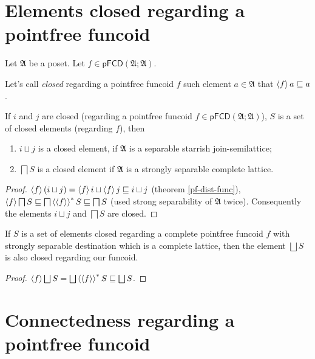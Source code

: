 \section{Elements closed regarding a pointfree funcoid}

Let $\mathfrak{A}$ be a poset. Let $f\in\mathsf{pFCD}(\mathfrak{A};\mathfrak{A})$.
\begin{defn}
Let's call \emph{closed}
regarding a pointfree funcoid $f$ such element $a\in\mathfrak{A}$
that $\left\langle f\right\rangle a\sqsubseteq a$.\end{defn}
\begin{prop}
If $i$ and $j$ are closed (regarding a pointfree funcoid $f\in\mathsf{pFCD}(\mathfrak{A};\mathfrak{A})$),
$S$ is a set of closed elements (regarding $f$), then
\begin{enumerate}
\item $i\sqcup j$ is a closed element, if $\mathfrak{A}$ is a separable
starrish join-semilattice;
\item $\bigsqcap S$ is a closed element if $\mathfrak{A}$ is a strongly separable
complete lattice.
\end{enumerate}
\end{prop}
\begin{proof}
$\left\langle f\right\rangle(i\sqcup j)=\left\langle f\right\rangle i\sqcup\left\langle f\right\rangle j\sqsubseteq i\sqcup j$
(theorem \ref{pf-dist-func}), $\left\langle f\right\rangle\bigsqcap S\sqsubseteq\bigsqcap\left\langle \left\langle f\right\rangle\right\rangle ^{\ast}S\sqsubseteq\bigsqcap S$
(used strong separability of $\mathfrak{A}$ twice). Consequently the elements
$i\sqcup j$ and $\bigsqcap S$ are closed.\end{proof}
\begin{prop}
If $S$ is a set of elements closed regarding a complete pointfree
funcoid $f$ with strongly separable destination which is a complete lattice,
then the element $\bigsqcup S$ is also closed regarding our funcoid.\end{prop}
\begin{proof}
$\supfun f\bigsqcup S=\bigsqcup\rsupfun{\supfun f}S\sqsubseteq\bigsqcup S$.
\end{proof}

\section{Connectedness regarding a pointfree funcoid}

